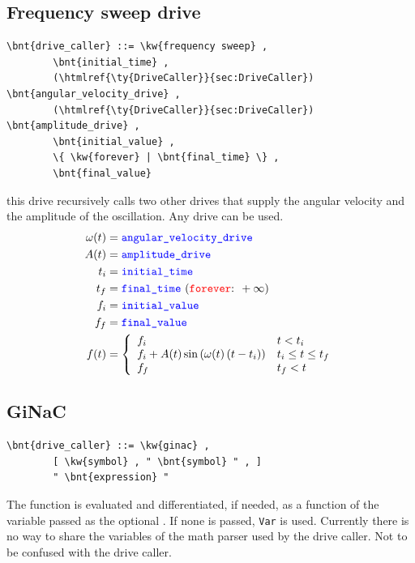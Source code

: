 \subsection{Frequency sweep drive}
\begin{Verbatim}[commandchars=\\\{\}]
    \bnt{drive_caller} ::= \kw{frequency sweep} ,
        \bnt{initial_time} ,
        (\htmlref{\ty{DriveCaller}}{sec:DriveCaller}) \bnt{angular_velocity_drive} ,
        (\htmlref{\ty{DriveCaller}}{sec:DriveCaller}) \bnt{amplitude_drive} ,
        \bnt{initial_value} ,
        \{ \kw{forever} | \bnt{final_time} \} ,
        \bnt{final_value}
\end{Verbatim}
this drive recursively calls two other drives that supply the angular velocity 
and the amplitude of the oscillation. Any drive can be used.
\begin{align}
	\omega(t) &= \nt{angular\_velocity\_drive}
	\nonumber \\
	A(t) &= \nt{amplitude\_drive}
	\nonumber \\
	t_i &= \nt{initial\_time}
	\nonumber \\
	t_f &= \nt{final\_time} \ (\text{\kw{forever}: } +\infty)
	\nonumber \\
	f_i &= \nt{initial\_value}
	\nonumber \\
	f_f &= \nt{final\_value}
	\nonumber \\
	f(t) &= \lcubr{\matr{ll}{
		f_i & t < t_i
		\\
		f_i + A(t) \sin\plbr{ \omega(t)\plbr{t - t_i} } & t_i \le t \le t_f
		\\
		f_f & t_f < t
	}}
\end{align}

\subsection{GiNaC}\label{sec:DriveCaller:GINAC}
\begin{Verbatim}[commandchars=\\\{\}]
    \bnt{drive_caller} ::= \kw{ginac} ,
        [ \kw{symbol} , " \bnt{symbol} " , ]
        " \bnt{expression} "
\end{Verbatim}
The function  is evaluated and differentiated, if needed,
as a function of the variable passed as the optional .
If none is passed, \texttt{Var} is used.
Currently there is no way to share the variables of the math parser
used by the  drive caller.
Not to be confused with the  drive caller.

